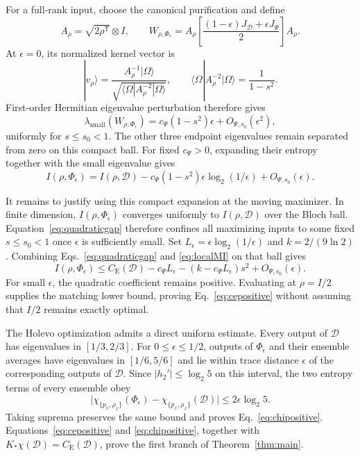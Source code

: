 \documentclass[aip,jmp,reprint,amsmath,amssymb]{revtex4-2}
\newcommand{\D}{\mathcal{D}}
\newcommand{\eps}{\epsilon}
\newcommand{\CE}{C_{\mathrm E}}
\begin{document}
For a full-rank input, choose the canonical purification and define
\begin{equation}
 A_\rho=\sqrt{2\rho^{\mathsf T}}\otimes I,\qquad
 W_{\rho,\Phi_\eps}=A_\rho\left[\frac{(1-\eps)J_\D+\eps J_\Psi}{2}\right]A_\rho.
 \label{eq:canonical}
\end{equation}
At $\eps=0$, its normalized kernel vector is
\begin{equation}
 |v_\rho\rangle=\frac{A_\rho^{-1}|\Omega\rangle}
 {\sqrt{\langle\Omega|A_\rho^{-2}|\Omega\rangle}},\qquad
 \langle\Omega|A_\rho^{-2}|\Omega\rangle=\frac{1}{1-s^2}.
 \label{eq:kernel}
\end{equation}
First-order Hermitian eigenvalue perturbation therefore gives
\begin{equation}
 \lambda_{\mathrm{small}}(W_{\rho,\Phi_\eps})
 =c_\Psi(1-s^2)\eps+O_{\Psi,s_0}(\eps^2),
 \label{eq:smalllambda}
\end{equation}
uniformly for $s\leq s_0<1$.  The other three endpoint eigenvalues remain separated from zero on this compact ball.  For fixed $c_\Psi>0$, expanding their entropy together with the small eigenvalue gives
\begin{equation}
 I(\rho,\Phi_\eps)=I(\rho,\D)
 -c_\Psi(1-s^2)\eps\log_2(1/\eps)+O_{\Psi,s_0}(\eps).
 \label{eq:localMI}
\end{equation}

It remains to justify using this compact expansion at the moving maximizer.  In finite dimension, $I(\rho,\Phi_\eps)$ converges uniformly to $I(\rho,\D)$ over the Bloch ball.  Equation~\eqref{eq:quadraticgap} therefore confines all maximizing inputs to some fixed $s\leq s_0<1$ once $\eps$ is sufficiently small.  Set $L_\eps=\eps\log_2(1/\eps)$ and $k=2/(9\ln2)$.  Combining Eqs.~\eqref{eq:quadraticgap} and \eqref{eq:localMI} on that ball gives
\begin{equation}
 I(\rho,\Phi_\eps)\leq\CE(\D)-c_\Psi L_\eps
 -(k-c_\Psi L_\eps)s^2+O_{\Psi,s_0}(\eps).
 \label{eq:optimizedupper}
\end{equation}
For small $\eps$, the quadratic coefficient remains positive.  Evaluating at $\rho=I/2$ supplies the matching lower bound, proving Eq.~\eqref{eq:cepositive} without assuming that $I/2$ remains exactly optimal.

The Holevo optimization admits a direct uniform estimate.  Every output of $\D$ has eigenvalues in $[1/3,2/3]$.  For $0\leq\eps\leq1/2$, outputs of $\Phi_\eps$ and their ensemble averages have eigenvalues in $[1/6,5/6]$ and lie within trace distance $\eps$ of the corresponding outputs of $\D$.  Since $|h_2'|\leq\log_2 5$ on this interval, the two entropy terms of every ensemble obey
\begin{equation}
 \big|\chi_{\{p_x,\rho_x\}}(\Phi_\eps)
       -\chi_{\{p_x,\rho_x\}}(\D)\big|
 \leq2\eps\log_2 5.
 \label{eq:holevobound}
\end{equation}
Taking suprema preserves the same bound and proves Eq.~\eqref{eq:chipositive}.  Equations~\eqref{eq:cepositive} and \eqref{eq:chipositive}, together with $K_*\chi(\D)=\CE(\D)$, prove the first branch of Theorem~\ref{thm:main}.
\end{document}
